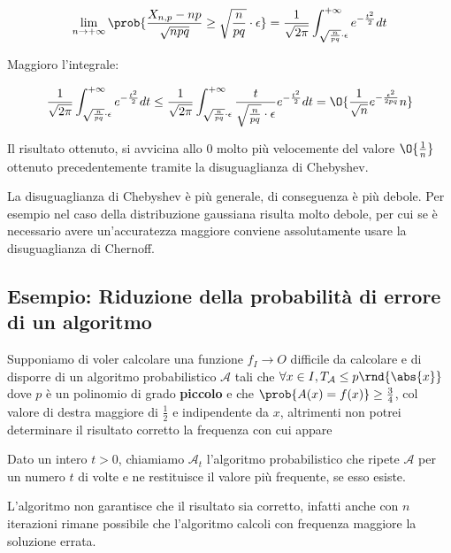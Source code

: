 \documentclass[\main/main.tex]{subfiles}
\begin{document}
\[
  \lim_{n\rightarrow+\infty} \prob{\frac{X_{n,p} - np}{\sqrt{npq}}\geq \sqrt{\frac{n}{pq}}\cdot \epsilon} = \frac{1}{\sqrt{2\pi}} \int_{\sqrt{\frac{n}{pq}}\cdot \epsilon}^{+\infty} e^{-\frac{t^2}{2}} dt
\]

Maggioro l'integrale:

\[
  \frac{1}{\sqrt{2\pi}} \int_{\sqrt{\frac{n}{pq}}\cdot \epsilon}^{+\infty} e^{-\frac{t^2}{2}} dt \leq \frac{1}{\sqrt{2\pi}} \int_{\sqrt{\frac{n}{pq}}\cdot \epsilon}^{+\infty} \frac{t}{\sqrt{\frac{n}{pq}}\cdot \epsilon}e^{-\frac{t^2}{2}} dt = \O{\frac{1}{\sqrt{n}} e^{-\frac{\epsilon^2}{2pq}}n}
\]

Il risultato ottenuto, si avvicina allo \(0\) molto più velocemente del valore \(\O{\frac{1}{n}}\) ottenuto precedentemente tramite la disuguaglianza di Chebyshev.

La disuguaglianza di Chebyshev è più generale, di conseguenza è più debole. Per esempio nel caso della distribuzione gaussiana risulta molto debole, per cui se è necessario avere un'accuratezza maggiore conviene assolutamente usare la disuguaglianza di Chernoff.

\subsection{Esempio: Riduzione della probabilità di errore di un algoritmo}
Supponiamo di voler calcolare una funzione \(f_ I \rightarrow O\) difficile da calcolare e di disporre di un algoritmo probabilistico \(\mathcal{A}\) tali che \(\forall x \in I, T_{\mathcal{A}} \leq p\rnd{\abs{x}}\) dove \(p\) è un polinomio di grado \textbf{piccolo} e che \(\prob{A(x) = f(x)} \geq \frac{3}{4}\), col valore di destra maggiore di \(\frac{1}{2}\) e indipendente da \(x\), altrimenti non potrei determinare il risultato corretto la frequenza con cui appare

Dato un intero \(t > 0\), chiamiamo \(\mathcal{A}_t\) l'algoritmo probabilistico che ripete \(\mathcal{A}\) per un numero \(t\) di volte e ne restituisce il valore più frequente, se esso esiste.

L'algoritmo non garantisce che il risultato sia corretto, infatti anche con \(n\) iterazioni rimane possibile che l'algoritmo calcoli con frequenza maggiore la soluzione errata.

\IncMargin{1em}
\begin{algorithm}
  \BlankLine
  \caption{Riduzione della probabilità di errore}\label{algo_disjdecomp}
\end{algorithm}\DecMargin{1em}
\end{document}
